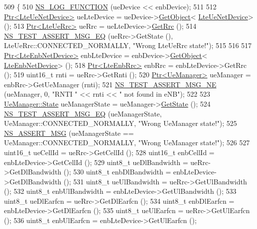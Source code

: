 \begin{DoxyCode}
509 \{
510   \hyperlink{log-macros-disabled_8h_a90b90d5bad1f39cb1b64923ea94c0761}{NS\_LOG\_FUNCTION} (ueDevice << enbDevice);
511 
512   \hyperlink{classns3_1_1Ptr}{Ptr<LteUeNetDevice>} ueLteDevice = ueDevice->\hyperlink{classns3_1_1Object_a13e18c00017096c8381eb651d5bd0783}{GetObject}<
      \hyperlink{classns3_1_1LteUeNetDevice}{LteUeNetDevice}> ();
513   \hyperlink{classns3_1_1Ptr}{Ptr<LteUeRrc>} ueRrc = ueLteDevice->\hyperlink{classns3_1_1LteUeNetDevice_a1f84e8e99aeb10f4242bbfc7b57a8128}{GetRrc} ();
514   \hyperlink{group__testing_ga2a9d78cffb3db8e867c35fff0b698cf5}{NS\_TEST\_ASSERT\_MSG\_EQ} (ueRrc->GetState (), LteUeRrc::CONNECTED\_NORMALLY, \textcolor{stringliteral}{"Wrong
       LteUeRrc state!"});
515 
516 
517   \hyperlink{classns3_1_1Ptr}{Ptr<LteEnbNetDevice>} enbLteDevice = enbDevice->\hyperlink{classns3_1_1Object_a13e18c00017096c8381eb651d5bd0783}{GetObject}<
      \hyperlink{classns3_1_1LteEnbNetDevice}{LteEnbNetDevice}> ();
518   \hyperlink{classns3_1_1Ptr}{Ptr<LteEnbRrc>} enbRrc = enbLteDevice->GetRrc ();
519   uint16\_t rnti = ueRrc->GetRnti ();
520   \hyperlink{classns3_1_1Ptr}{Ptr<UeManager>} ueManager = enbRrc->GetUeManager (rnti);
521   \hyperlink{group__testing_ga73d66fb0050a5111453fd144e767b91a}{NS\_TEST\_ASSERT\_MSG\_NE} (ueManager, 0, \textcolor{stringliteral}{"RNTI "} << rnti << \textcolor{stringliteral}{" not found in eNB"});
522 
523   \hyperlink{classns3_1_1UeManager_a2f4085fdd18d7125c27da44a5b8b6808}{UeManager::State} ueManagerState = ueManager->\hyperlink{classns3_1_1UeManager_a401868bb61523c594c69024e2231467a}{GetState} ();
524   \hyperlink{group__testing_ga2a9d78cffb3db8e867c35fff0b698cf5}{NS\_TEST\_ASSERT\_MSG\_EQ} (ueManagerState, UeManager::CONNECTED\_NORMALLY, \textcolor{stringliteral}{"Wrong
       UeManager state!"});
525   \hyperlink{assert_8h_aff5ece9066c74e681e74999856f08539}{NS\_ASSERT\_MSG} (ueManagerState == UeManager::CONNECTED\_NORMALLY, \textcolor{stringliteral}{"Wrong UeManager state!"});
526 
527   uint16\_t ueCellId = ueRrc->GetCellId ();
528   uint16\_t enbCellId = enbLteDevice->GetCellId ();
529   uint8\_t ueDlBandwidth = ueRrc->GetDlBandwidth ();
530   uint8\_t enbDlBandwidth = enbLteDevice->GetDlBandwidth ();
531   uint8\_t ueUlBandwidth = ueRrc->GetUlBandwidth ();
532   uint8\_t enbUlBandwidth = enbLteDevice->GetUlBandwidth ();
533   uint8\_t ueDlEarfcn = ueRrc->GetDlEarfcn ();
534   uint8\_t enbDlEarfcn = enbLteDevice->GetDlEarfcn ();
535   uint8\_t ueUlEarfcn = ueRrc->GetUlEarfcn ();
536   uint8\_t enbUlEarfcn = enbLteDevice->GetUlEarfcn ();

\end{DoxyCode}
